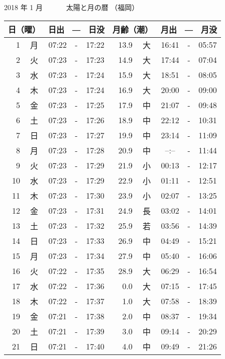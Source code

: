 \documentclass[a4j,10pt]{jsarticle}
\begin{document}
\pagestyle{empty}
\begin{center}
{\large 2018 年  1 月}
{\Large 　　　太陽と月の暦   （福岡） }
\begin{table}[ht]
\begin{center}
\begin{tabular}{|rc|ccc|rc|ccc|}
\hline
\multicolumn{2}{|c|}{日（曜）} & \multicolumn{3}{c|}{日出　―　日没} & \multicolumn{2}{c|}{月齢（潮）} & \multicolumn{3}{c|}{月出　―　月没}\\
     \hline
  1 & 月 & 07:22 &-& 17:22 & 13.9 & 大 & 16:41 &-& 05:57 \\
  2 & 火 & 07:23 &-& 17:23 & 14.9 & 大 & 17:44 &-& 07:04 \\
  3 & 水 & 07:23 &-& 17:24 & 15.9 & 大 & 18:51 &-& 08:05 \\
  4 & 木 & 07:23 &-& 17:24 & 16.9 & 大 & 20:00 &-& 09:00 \\
  5 & 金 & 07:23 &-& 17:25 & 17.9 & 中 & 21:07 &-& 09:48 \\
  6 & 土 & 07:23 &-& 17:26 & 18.9 & 中 & 22:12 &-& 10:31 \\
  7 & 日 & 07:23 &-& 17:27 & 19.9 & 中 & 23:14 &-& 11:09 \\
  8 & 月 & 07:23 &-& 17:28 & 20.9 & 中 & --:-- &-& 11:44 \\
  9 & 火 & 07:23 &-& 17:29 & 21.9 & 小 & 00:13 &-& 12:17 \\
 10 & 水 & 07:23 &-& 17:29 & 22.9 & 小 & 01:11 &-& 12:51 \\
 11 & 木 & 07:23 &-& 17:30 & 23.9 & 小 & 02:07 &-& 13:25 \\
 12 & 金 & 07:23 &-& 17:31 & 24.9 & 長 & 03:02 &-& 14:01 \\
 13 & 土 & 07:23 &-& 17:32 & 25.9 & 若 & 03:56 &-& 14:39 \\
 14 & 日 & 07:23 &-& 17:33 & 26.9 & 中 & 04:49 &-& 15:21 \\
 15 & 月 & 07:23 &-& 17:34 & 27.9 & 中 & 05:40 &-& 16:06 \\
 16 & 火 & 07:22 &-& 17:35 & 28.9 & 大 & 06:29 &-& 16:54 \\
 17 & 水 & 07:22 &-& 17:36 &  0.0 & 大 & 07:15 &-& 17:45 \\
 18 & 木 & 07:22 &-& 17:37 &  1.0 & 大 & 07:58 &-& 18:39 \\
 19 & 金 & 07:21 &-& 17:38 &  2.0 & 中 & 08:37 &-& 19:34 \\
 20 & 土 & 07:21 &-& 17:39 &  3.0 & 中 & 09:14 &-& 20:29 \\
 21 & 日 & 07:21 &-& 17:40 &  4.0 & 中 & 09:49 &-& 21:26 \\

\end{tabular}
\end{center}
\end{table}
\end{center}
\end{document}

